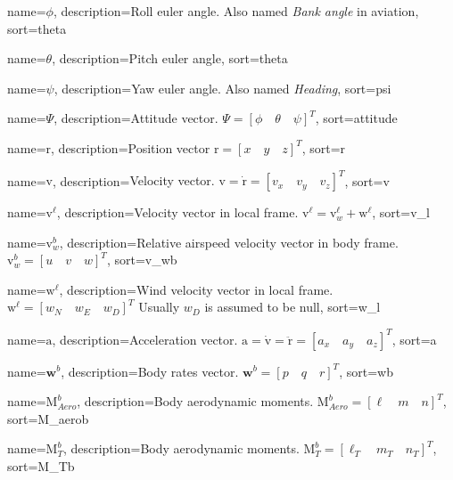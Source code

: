 {
	name={$\phi$},
  	description={Roll euler angle. Also named \textit{Bank angle} in aviation},
  	sort=theta
}

{
	name={$\theta$},
  	description={Pitch euler angle},
  	sort=theta
}

{
	name={$\psi$},
  	description={Yaw euler angle. Also named \textit{Heading}},
  	sort=psi
}

{
	name={$\Psi$},
	description={Attitude vector. $\Psi = [\phi \quad \theta \quad \psi]^T$},
	sort=attitude
}

{
	name={$\bm{\mathrm{r}}$},
	description={Position vector $\bm{\mathrm{r}} = [x \quad y \quad z]^{T}$},
  	sort=r
}

{
	name={$\bm{\mathrm{v}}$},
	description={Velocity vector. $\bm{\mathrm{v}} = \bm{\mathrm{\dot{r}}} = [v_x \quad v_y \quad v_z]^T$},
	sort=v
}

{
	name={$\bm{\mathrm{v}}^\ell$},
	description={Velocity vector in local frame. $\bm{\mathrm{v}}^\ell = \bm{\mathrm{v}}_w^\ell + \bm{\mathrm{w}}^\ell$},
	sort=v_l
}

{
	name={$\bm{\mathrm{v}}_w^b$},
	description={Relative airspeed velocity vector in body frame. $\bm{\mathrm{v}}_w^b = [u \quad v \quad w]^T$},
	sort=v_wb
}

{
	name={$\bm{\mathrm{w}}^\ell$},
	description={Wind velocity vector in local frame. $\bm{\mathrm{w}}^\ell = [w_N \quad w_E \quad w_D]^T$
				 Usually $w_D$ is assumed to be null},
	sort=w_l
}


{
	name={$\bm{\mathrm{a}}$},
	description={Acceleration vector. $\bm{\mathrm{a}} = \bm{\mathrm{\dot{v}}} = \bm{\mathrm{\ddot{r}}} = [a_x \quad a_y \quad a_z]^T$},
	sort=a
}

{
	name={$\bm{w}^b$},
	description={Body rates vector. $\bm{w}^b = [p \quad q \quad r]^T$},
	sort=wb
}

{
	name={$\bm{\mathrm{M}}_{Aero}^b$},
	description={Body aerodynamic moments. $\bm{\mathrm{M}}_{Aero}^b = [\ell \quad m \quad n]^T$},
	sort=M_aerob
}

{
	name={$\bm{\mathrm{M}}_T^b$},
	description={Body aerodynamic moments. $\bm{\mathrm{M}}_T^b = [\ell_T \quad m_T \quad n_T]^T$},
	sort=M_Tb
}

